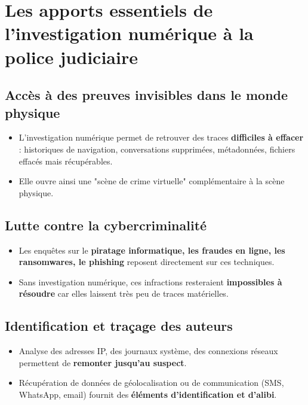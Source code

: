 \documentclass[12pt,a4paper]{article}
\begin{document}
\section{Les apports essentiels de l'investigation numérique à la police judiciaire}

\subsection{Accès à des preuves invisibles dans le monde physique}

\begin{itemize}[leftmargin=*]
    \item L'investigation numérique permet de retrouver des traces \textbf{difficiles à effacer} : historiques de navigation, conversations supprimées, métadonnées, fichiers effacés mais récupérables.
    \item Elle ouvre ainsi une "scène de crime virtuelle" complémentaire à la scène physique.
\end{itemize}

\subsection{Lutte contre la cybercriminalité}

\begin{itemize}[leftmargin=*]
    \item Les enquêtes sur le \textbf{piratage informatique, les fraudes en ligne, les ransomwares, le phishing} reposent directement sur ces techniques.
    \item Sans investigation numérique, ces infractions resteraient \textbf{impossibles à résoudre} car elles laissent très peu de traces matérielles.
\end{itemize}

\subsection{Identification et traçage des auteurs}

\begin{itemize}[leftmargin=*]
    \item Analyse des adresses IP, des journaux système, des connexions réseaux permettent de \textbf{remonter jusqu'au suspect}.
    \item Récupération de données de géolocalisation ou de communication (SMS, WhatsApp, email) fournit des \textbf{éléments d'identification et d'alibi}.
\end{itemize}
\end{document}
